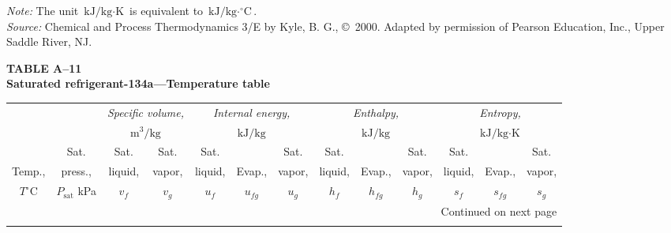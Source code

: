 \documentclass[12pt,a3paper]{article}
\begin{document}
\begin{enumerate}
\vspace{0.1cm}
\noindent\footnotesize \textit{Note:} The unit $\text{kJ/kg}\cdot\text{K}$ is equivalent to $\text{kJ/kg}\cdot^\circ\text{C}$. \\
\textit{Source:} Chemical and Process Thermodynamics 3/E by Kyle, B. G., \copyright~2000. Adapted by permission of Pearson Education, Inc., Upper Saddle River, NJ.


\noindent\textbf{\Large TABLE A--11} \\
\noindent\textbf{\large Saturated refrigerant-134a---Temperature table}
\vspace{0.3cm}

\begin{center}
\small
\begin{longtable}{c c c c c c c c c c c c c}
\toprule\toprule
& & \multicolumn{2}{c}{\textit{Specific volume,}} & \multicolumn{3}{c}{\textit{Internal energy,}} & \multicolumn{3}{c}{\textit{Enthalpy,}} & \multicolumn{3}{c}{\textit{Entropy,}} \\
& & \multicolumn{2}{c}{$\text{m}^3\text{/kg}$} & \multicolumn{3}{c}{$\text{kJ/kg}$} & \multicolumn{3}{c}{$\text{kJ/kg}$} & \multicolumn{3}{c}{$\text{kJ/kg}\cdot\text{K}$} \\
\cmidrule(lr){3-4} \cmidrule(lr){5-7} \cmidrule(lr){8-10} \cmidrule(lr){11-13}
& Sat. & Sat. & Sat. & Sat. & & Sat. & Sat. & & Sat. & Sat. & & Sat. \\
Temp., & press., & liquid, & vapor, & liquid, & Evap., & vapor, & liquid, & Evap., & vapor, & liquid, & Evap., & vapor, \\
$T^\circ\text{C}$ & $P_{\text{sat}}$ kPa & $v_f$ & $v_g$ & $u_f$ & $u_{fg}$ & $u_g$ & $h_f$ & $h_{fg}$ & $h_g$ & $s_f$ & $s_{fg}$ & $s_g$ \\
\midrule
\endhead

\midrule
\multicolumn{13}{r}{{Continued on next page}} \\
\bottomrule
\endfoot

\bottomrule\bottomrule
\endlastfoot


\end{longtable}
\end{center}
\end{enumerate}
\end{document}
